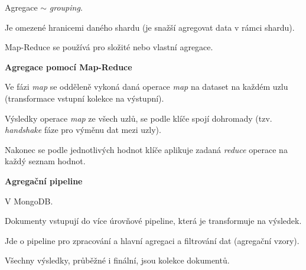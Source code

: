 \begin{compactitem}
    \item Agregace $\sim$ \textit{grouping}.
    \item Je omezené hranicemi daného shardu (je snažší agregovat data v rámci shardu).
    \item Map-Reduce se používá pro složité nebo vlastní agregace.

    \item \textbf{Agregace pomocí Map-Reduce} \begin{compactitem}
        \item Ve fázi \textit{map} se odděleně vykoná daná operace \textit{map} na dataset na každém uzlu (transformace vstupní kolekce na výstupní).
        \item Výsledky operace \textit{map} ze všech uzlů, se podle klíče spojí dohromady (tzv. \textit{handshake} fáze pro výměnu dat mezi uzly).
        \item Nakonec se podle jednotlivých hodnot klíče aplikuje zadaná \textit{reduce} operace na každý seznam hodnot.
    \end{compactitem}

    \item \textbf{Agregační pipeline} \begin{compactitem}
        \item V MongoDB.
        \item Dokumenty vstupují do více úrovňové pipeline, která je transformuje na výsledek.
        \item Jde o pipeline pro zpracování a hlavní agregaci a filtrování dat (agregační vzory).
        \item Všechny výsledky, průběžné i finální, jsou kolekce dokumentů.
    \end{compactitem}
\end{compactitem}
